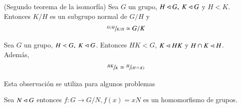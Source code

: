 \begin{thm}(Segundo teorema de la isomorfía)
	Sea $G$ un grupo, $H \lhd G,\ K \lhd G$ y $H < K$. Entonces $K/H$ es un subgrupo normal de $G/H$ y
	\begin{align}
		\sfrac{G/H}{K/H} \simeq G/K
	\end{align}
\end{thm}

\begin{thm}
	Sea $G$ un grupo, $H < G,\ K \lhd G$. Entonces $HK < G$, $K \lhd HK$ y $H\cap K \lhd H$. Además,
	\begin{align}
		\sfrac{HK}{K} \simeq \sfrac{H}{(H \cap K)}
	\end{align}
\end{thm}

Esta observación se utiliza para algunos problemas %

\begin{obs}
	Sea $N \lhd G$ entonces $f:G \to G/N, f(x) = xN$ es un homomorfismo de grupos.
\end{obs}